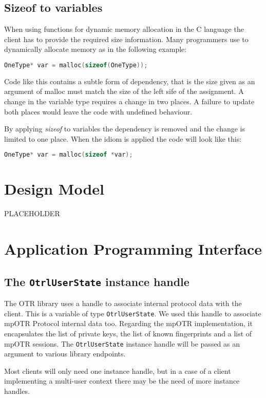 \subsection{Sizeof to variables}
When using functions for dynamic memory allocation in the C language the client has to provide the required size information. Many programmers use to dynamically allocate memory as in the following example:
\begin{lstlisting}[language=C]
  OneType* var = malloc(sizeof(OneType));
\end{lstlisting}

Code like this contains a subtle form of dependency, that is the size given as an argument of malloc must match the size of the left sife of the assignment. A change in the variable type requires a change in two places. A failure to update both places would leave the code with undefined behaviour.

By applying \textit{sizeof} to variables the dependency is removed and the change is limited to one place. When the idiom is applied the code will look like this:
\begin{lstlisting}[language=C]
  OneType* var = malloc(sizeof *var);
\end{lstlisting}

\section{Design Model}
PLACEHOLDER

\section{Application Programming Interface}

\subsection{The \texttt{OtrlUserState} instance handle}
The OTR library uses a handle to associate internal protocol data with the client. This is a variable of type \texttt{OtrlUserState}. We used this handle to associate mpOTR Protocol internal data too. Regarding the mpOTR implementation, it encapsulates the list of private keys, the list of known fingerprints and a list of mpOTR sessions. The \texttt{OtrlUserState} instance handle will be passed as an argument to various library endpoints.

Most clients will only need one instance handle, but in a case of a client implementing a multi-user context there may be the need of more instance handles.

